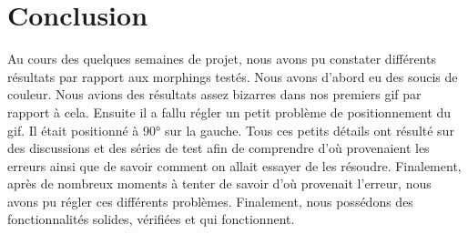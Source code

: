 \section{Conclusion}

Au cours des quelques semaines de projet, nous avons pu constater différents résultats par rapport aux morphings testés. Nous avons d’abord eu des soucis de couleur. Nous avions des résultats assez bizarres dans nos premiers gif par rapport à cela. Ensuite il a fallu régler un petit problème de positionnement du gif. Il était positionné à 90° sur la gauche. Tous ces petits détails ont résulté sur des discussions et des séries de test afin de comprendre d’où provenaient les erreurs ainsi que de savoir comment on allait essayer de les résoudre. Finalement, après de nombreux moments à tenter de savoir d’où provenait l’erreur, nous avons pu régler ces différents problèmes.
Finalement, nous possédons des fonctionnalités solides, vérifiées et qui fonctionnent.
